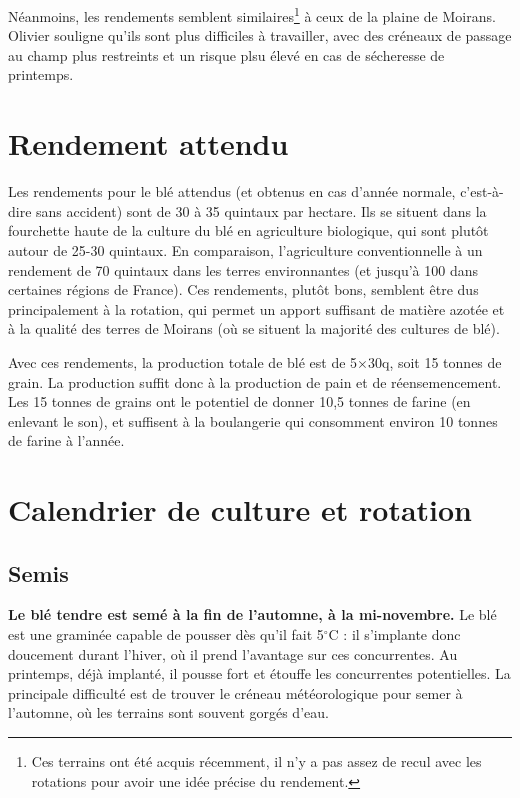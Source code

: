 \documentclass{article}
\begin{document}
Néanmoins, les rendements semblent similaires\footnote{Ces terrains ont été acquis récemment, il n'y a pas assez de recul avec les rotations pour avoir une idée précise du rendement.} à ceux de la plaine de Moirans. Olivier souligne qu'ils sont plus difficiles à travailler, avec des créneaux de passage au champ plus restreints et un risque plsu élevé en cas de sécheresse de printemps.

\section{Rendement attendu}

Les rendements pour le blé attendus (et obtenus en cas d'année normale, c'est-à-dire sans accident) sont de 30 à 35 quintaux par hectare. Ils se situent dans la fourchette haute de la culture du blé en agriculture biologique, qui sont plutôt autour de 25-30 quintaux. En comparaison, l'agriculture conventionnelle à un rendement de 70 quintaux dans les terres environnantes (et jusqu'à 100 dans certaines régions de France). Ces rendements, plutôt bons, semblent être dus principalement à la rotation, qui permet un apport suffisant de matière azotée et à la qualité des terres de Moirans (où se situent la majorité des cultures de blé). 

Avec ces rendements, la production totale de blé est de 5$\times$30q, soit 15 tonnes de grain. La production suffit donc à la production de pain et de réensemencement. Les 15 tonnes de grains ont le potentiel de donner 10,5 tonnes de farine (en enlevant le son), et suffisent à la boulangerie qui consomment environ 10 tonnes de farine à l'année.

\section{Calendrier de culture et rotation}
\label{part:rotation}

\subsection*{Semis}

\textbf{Le blé tendre est semé à la fin de l'automne, à la mi-novembre.} Le blé est une graminée capable de pousser dès qu'il fait 5$^\circ$C : il s'implante donc doucement durant l'hiver, où il prend l'avantage sur ces concurrentes. Au printemps, déjà implanté, il pousse fort et étouffe les concurrentes potentielles. La principale difficulté est de trouver le créneau météorologique pour semer à l'automne, où les terrains sont souvent gorgés d'eau. 
\end{document}
